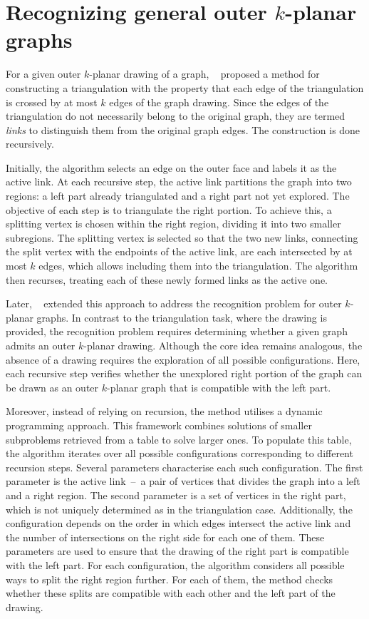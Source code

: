 \section{Recognizing general outer \(k\)-planar graphs}

For a given outer \(k\)-planar drawing of a graph, \citeauthor{triangulations}~\cite{triangulations} proposed a method for constructing a triangulation with the property that each edge of the triangulation is crossed by at most \(k\) edges of the graph drawing. Since the edges of the triangulation do not necessarily belong to the original graph, they are termed \emph{links} to distinguish them from the original graph edges. The construction is done recursively.

Initially, the algorithm selects an edge on the outer face and labels it as the active link. At each recursive step, the active link partitions the graph into two regions: a left part already triangulated and a right part not yet explored. The objective of each step is to triangulate the right portion. To achieve this, a splitting vertex is chosen within the right region, dividing it into two smaller subregions. The splitting vertex is selected so that the two new links, connecting the split vertex with the endpoints of the active link, are each intersected by at most \(k\) edges, which allows including them into the triangulation. The algorithm then recurses, treating each of these newly formed links as the active one.

Later, \citeauthor{okp}~\cite{okp} extended this approach to address the recognition problem for outer \(k\)-planar graphs. In contrast to the triangulation task, where the drawing is provided, the recognition problem requires determining whether a given graph admits an outer \(k\)-planar drawing. Although the core idea remains analogous, the absence of a drawing requires the exploration of all possible configurations. Here, each recursive step verifies whether the unexplored right portion of the graph can be drawn as an outer \(k\)-planar graph that is compatible with the left part.

Moreover, instead of relying on recursion, the method utilises a dynamic programming approach. This framework combines solutions of smaller subproblems retrieved from a table to solve larger ones. To populate this table, the algorithm iterates over all possible configurations corresponding to different recursion steps. Several parameters characterise each such configuration. The first parameter is the active link~--~a pair of vertices that divides the graph into a left and a right region. The second parameter is a set of vertices in the right part, which is not uniquely determined as in the triangulation case. Additionally, the configuration depends on the order in which edges intersect the active link and the number of intersections on the right side for each one of them. These parameters are used to ensure that the drawing of the right part is compatible with the left part. For each configuration, the algorithm considers all possible ways to split the right region further. For each of them, the method checks whether these splits are compatible with each other and the left part of the drawing.

